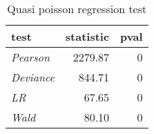 \begin{wraptable}{r}{3.5in}

\caption{\label{tab:quasipoisson_reg_tests}Quasi poisson regression test}
\centering
\fontsize{9}{11}\selectfont
\begin{tabular}[t]{>{}lrr}
\toprule
test & statistic & pval\\
\midrule
\em{Pearson} & 2279.87 & 0\\
\em{Deviance} & 844.71 & 0\\
\em{LR} & 67.65 & 0\\
\em{Wald} & 80.10 & 0\\
\bottomrule
\end{tabular}
\end{wraptable}
